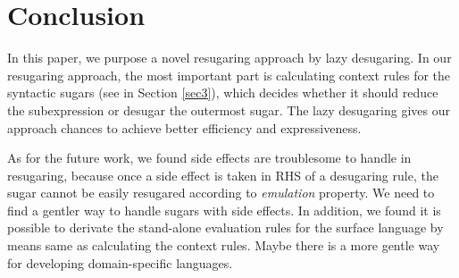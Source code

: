 \section{Conclusion}
\label{sec7}


In this paper, we purpose a novel resugaring approach by lazy desugaring.
In our resugaring approach, the most important part is calculating context rules for the syntactic sugars (see in Section \ref{sec3}), which decides whether it should reduce the subexpression or desugar the outermost sugar. The lazy desugaring gives our approach chances to achieve better efficiency and expressiveness.



As for the future work, we found side effects are troublesome to handle in resugaring, because once a side effect is taken in RHS of a desugaring rule, the sugar cannot be easily resugared according to \emph{emulation} property. We need to find a gentler way to handle sugars with side effects. In addition, we found it is possible to derivate the stand-alone evaluation rules for the surface language by means same as calculating the context rules. Maybe there is a more gentle way for developing domain-specific languages.
